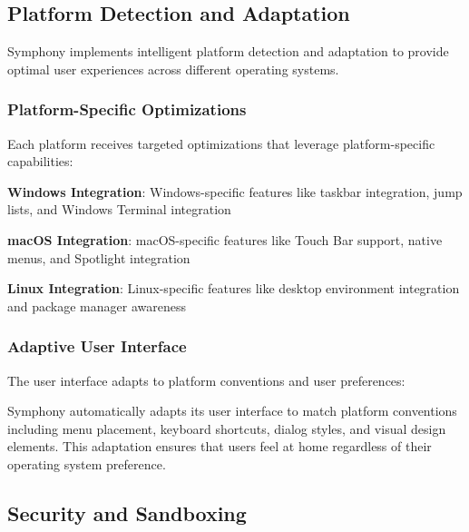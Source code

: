 \subsection*{Platform Detection and Adaptation}

Symphony implements intelligent platform detection and adaptation to provide optimal user experiences across different operating systems.

\subsubsection*{Platform-Specific Optimizations}

Each platform receives targeted optimizations that leverage platform-specific capabilities:

\begin{expandedlist}
    \item \textbf{Windows Integration}: Windows-specific features like taskbar integration, jump lists, and Windows Terminal integration
    \item \textbf{macOS Integration}: macOS-specific features like Touch Bar support, native menus, and Spotlight integration
    \item \textbf{Linux Integration}: Linux-specific features like desktop environment integration and package manager awareness
\end{expandedlist}

\subsubsection*{Adaptive User Interface}

The user interface adapts to platform conventions and user preferences:

\begin{infobox}[title=Platform UI Adaptation]
Symphony automatically adapts its user interface to match platform conventions including menu placement, keyboard shortcuts, dialog styles, and visual design elements. This adaptation ensures that users feel at home regardless of their operating system preference.
\end{infobox}

\subsection*{Security and Sandboxing}

